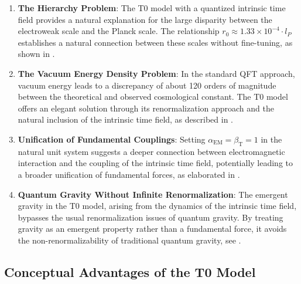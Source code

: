 \documentclass[12pt,a4paper]{article}
\newcommand{\alphaEM}{\alpha_{\text{EM}}}
\newcommand{\betaT}{\beta_{\text{T}}}
\begin{document}
	\begin{enumerate}
		\item \textbf{The Hierarchy Problem}: The T0 model with a quantized intrinsic time field provides a natural explanation for the large disparity between the electroweak scale and the Planck scale. The relationship $r_0 \approx 1.33 \times 10^{-4} \cdot l_P$ establishes a natural connection between these scales without fine-tuning, as shown in \cite{pascher_params_2025_en}.
		
		\item \textbf{The Vacuum Energy Density Problem}: In the standard QFT approach, vacuum energy leads to a discrepancy of about 120 orders of magnitude between the theoretical and observed cosmological constant. The T0 model offers an elegant solution through its renormalization approach and the natural inclusion of the intrinsic time field, as described in \cite{pascher_temp_2025_en}.
		
		\item \textbf{Unification of Fundamental Couplings}: Setting $\alphaEM = \betaT = 1$ in the natural unit system suggests a deeper connection between electromagnetic interaction and the coupling of the intrinsic time field, potentially leading to a broader unification of fundamental forces, as elaborated in \cite{pascher_alphabeta_2025_en}.
		
		\item \textbf{Quantum Gravity Without Infinite Renormalization}: The emergent gravity in the T0 model, arising from the dynamics of the intrinsic time field, bypasses the usual renormalization issues of quantum gravity. By treating gravity as an emergent property rather than a fundamental force, it avoids the non-renormalizability of traditional quantum gravity, see \cite{pascher_emergente_gravitation_2025_en}.
	\end{enumerate}
	
	\subsection{Conceptual Advantages of the T0 Model}
	\label{sec:konzeptionelle_vorteile}
	
\end{document}
